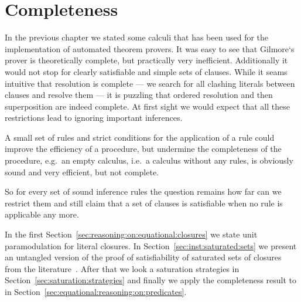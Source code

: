 
\chapter{Completeness}

In the previous chapter we stated some calculi
that has been used for the implementation
of automated theorem provers.
%
It was easy to see that Gilmore`s prover is theoretically complete,
but practically very inefficient.
Additionally it would not stop for clearly satisfiable and simple sets of clauses.
While it seams intuitive that resolution is complete
--- we search for all clashing literals between clauses and resolve them ---
it is puzzling that ordered resolution and then superposition are indeed complete.
At first sight we would expect that all these restrictions
lead to ignoring important inferences.

A small set of rules and strict conditions for the application of a rule
could improve the efficiency of a procedure, but undermine the completeness
of the procedure, e.g.~an empty calculus,
i.e.~a calculus without any rules,
is obviously sound and very efficient, but not complete.

So for every set of sound inference rules the question remains
how far can we restrict them and still claim
that a set of clauses is satisfiable when no rule is applicable any more.







In the first Section~\vref{sec:reasoning:on:equational:closures}
we state unit paramodulation for literal closures.
In Section~\vref{sec:inst:saturated:sets} we present
an untangled version of the proof of satisfiability
of saturated sets of closures
from the literature~\cite{GK2004csl}.
After that we look a saturation strategies in
Section~\vref{sec:saturation:strategies}
and finally we apply the completeness result to \InstGenEQ{}
in Section~\vref{sec:equational:reasoning:on:predicates}.




